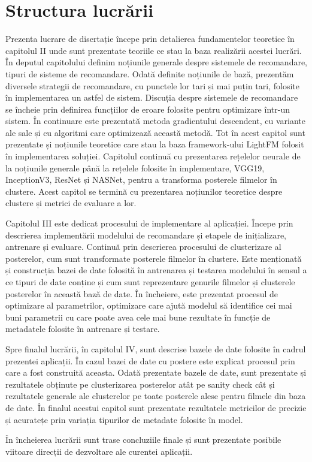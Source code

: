 \section{Structura lucrării}
Prezenta lucrare de disertație începe prin detalierea fundamentelor teoretice în capitolul II unde sunt prezentate teoriile ce stau la baza realizării acestei lucrări. În deputul capitolului definim noțiunile generale despre sistemele de recomandare, tipuri de sisteme de recomandare. Odată definite noțiunile de bază, prezentăm diversele strategii de recomandare, cu punctele lor tari și mai puțin tari, folosite în implementarea un astfel de sistem. Discuția despre sistemele de recomandare se încheie prin definirea funcțiilor de eroare folosite pentru optimizare într-un sistem. În continuare este prezentată metoda gradientului descendent, cu variante ale sale și cu algoritmi care optimizează această metodă. Tot în acest capitol sunt prezentate și noțiunile teoretice care stau la baza framework-ului LightFM folosit în implementarea soluției. Capitolul continuă cu prezentarea rețelelor neurale de la noțiunile generale până la rețelele folosite în implementare, VGG19, InceptionV3, ResNet și NASNet, pentru a transforma posterele filmelor în clustere. Acest capitol se termină cu prezentarea noțiunilor teoretice despre clustere și metrici de evaluare a lor.

Capitolul III este dedicat procesului de implementare al aplicației. Începe prin descrierea implementării modelului de recomandare și etapele de inițializare, antrenare și evaluare. Continuă prin descrierea procesului de clusterizare al posterelor, cum sunt transformate posterele filmelor în clustere. Este menționată și construcția bazei de date folosită în antrenarea și testarea modelului în sensul a ce tipuri de date conține și cum sunt reprezentare genurile filmelor și clusterele posterelor în această bază de date. În încheiere, este prezentat procesul de optimizare al parametrilor, optimizare care ajută modelul să identifice cei mai buni parametrii cu care poate avea cele mai bune rezultate în funcție de metadatele folosite în antrenare și testare.

Spre finalul lucrării, în capitolul IV, sunt descrise bazele de date folosite în cadrul prezentei aplicații. În cazul bazei de date cu postere este explicat procesul prin care a fost construită aceasta. Odată prezentate bazele de date, sunt prezentate și rezultatele obținute pe clusterizarea posterelor atât pe sanity check cât și rezultatele generale ale clusterelor pe toate posterele alese pentru filmele din baza de date. În finalul acestui capitol sunt prezentate rezultatele metricilor de precizie și acuratețe prin variația tipurilor de metadate folosite în model.

În încheierea lucrării sunt trase concluziile finale și sunt prezentate posibile viitoare
direcții de dezvoltare ale curentei aplicații.